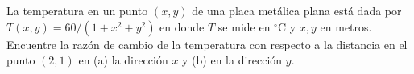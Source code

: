 \item La temperatura en un punto $(x, y)$ de una placa metálica plana está dada por $T(x, y) = 60 / (1 + x^2 + y^2)$ en donde $T$ se mide en $^\circ\text{C}$ y $x, y$ en metros. Encuentre la razón de cambio de la temperatura con respecto a la distancia en el punto $(2, 1)$ en (a) la dirección $x$ y (b) en la dirección $y$.
